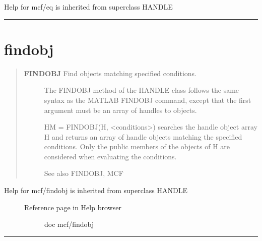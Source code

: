 \documentclass[letterpaper,10pt,english]{sphinxmanual}
\begin{document}
Help for mcf/eq is inherited from superclass HANDLE


\bigskip\hrule{}\bigskip



\section{findobj}
\label{classes/utils/@mcf/mcf:id7}\label{classes/utils/@mcf/mcf:findobj}\begin{quote}
\begin{description}
\item[{\textbf{FINDOBJ}   Find objects matching specified conditions.}] \leavevmode
The FINDOBJ method of the HANDLE class follows the same syntax as the
MATLAB FINDOBJ command, except that the first argument must be an array
of handles to objects.

HM = FINDOBJ(H, \textless{}conditions\textgreater{}) searches the handle object array H and
returns an array of handle objects matching the specified conditions.
Only the public members of the objects of H are considered when
evaluating the conditions.

See also FINDOBJ, MCF

\end{description}
\end{quote}
\begin{description}
\item[{Help for mcf/findobj is inherited from superclass HANDLE}] \leavevmode\begin{description}
\item[{Reference page in Help browser}] \leavevmode
doc mcf/findobj

\end{description}

\end{description}


\bigskip\hrule{}\bigskip
\end{document}
